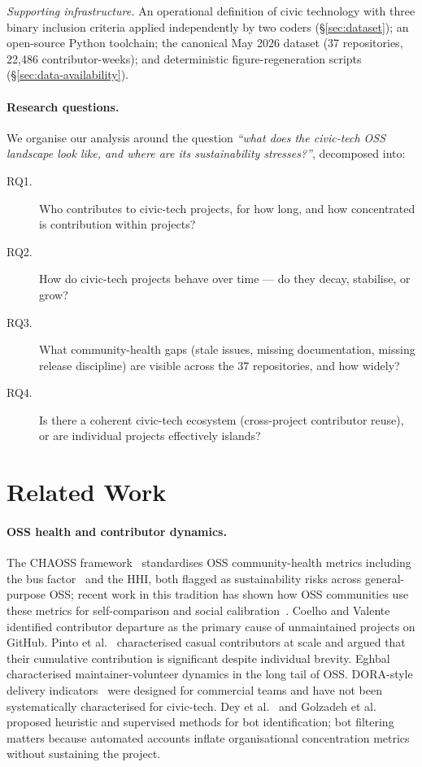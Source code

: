 \documentclass[a4paper,UKenglish,cleveref,autoref,thm-restate]{lipics-v2021}
\begin{document}
\emph{Supporting infrastructure.} An operational definition of civic technology with three binary inclusion criteria applied independently by two coders (\S\ref{sec:dataset}); an open-source Python toolchain; the canonical May 2026 dataset (37 repositories, 22{,}486 contributor-weeks); and deterministic figure-regeneration scripts (\S\ref{sec:data-availability}).

\paragraph{Research questions.} We organise our analysis around the question \emph{``what does the civic-tech OSS landscape look like, and where are its sustainability stresses?''}, decomposed into:
\begin{description}
\item[RQ1.] Who contributes to civic-tech projects, for how long, and how concentrated is contribution within projects?
\item[RQ2.] How do civic-tech projects behave over time --- do they decay, stabilise, or grow?
\item[RQ3.] What community-health gaps (stale issues, missing documentation, missing release discipline) are visible across the 37 repositories, and how widely?
\item[RQ4.] Is there a coherent civic-tech ecosystem (cross-project contributor reuse), or are individual projects effectively islands?
\end{description}

\section{Related Work}\label{sec:related}

\paragraph{OSS health and contributor dynamics.}
The CHAOSS framework~\cite{Goggins2021} standardises OSS community-health metrics including the bus factor~\cite{Avelino2016} and the HHI, both flagged as sustainability risks across general-purpose OSS; recent work in this tradition has shown how OSS communities use these metrics for self-comparison and social calibration~\cite{Lumbard2024}. Coelho and Valente~\cite{Coelho2017} identified contributor departure as the primary cause of unmaintained projects on GitHub. Pinto et al.~\cite{Pinto2016} characterised casual contributors at scale and argued that their cumulative contribution is significant despite individual brevity. Eghbal~\cite{Eghbal2020} characterised maintainer-volunteer dynamics in the long tail of OSS. DORA-style delivery indicators~\cite{Forsgren2018,Forsgren2021} were designed for commercial teams and have not been systematically characterised for civic-tech. Dey et al.~\cite{Dey2020} and Golzadeh et al.~\cite{Golzadeh2021} proposed heuristic and supervised methods for bot identification; bot filtering matters because automated accounts inflate organisational concentration metrics without sustaining the project.
\end{document}
